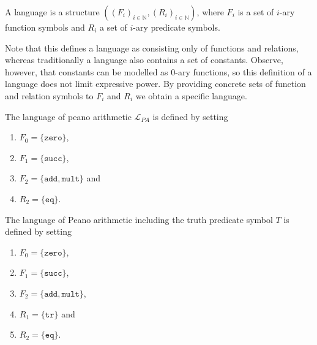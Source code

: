 \begin{definition}\label{def:FO-language}
    \leanok
    A language is a structure $((F_i)_{i\in \mathbb{N}}, (R_i)_{i\in \mathbb{N}})$, where $F_i$ is a set of $i$-ary function symbols and $R_i$ a set of $i$-ary predicate symbols.
\end{definition}

Note that this defines a language as consisting only of functions and relations, whereas traditionally a language also contains a set of constants. Observe, however, that constants can be modelled as $0$-ary functions, so this definition of a language does not limit expressive power. By providing concrete sets of function and relation symbols to $F_i$ and $R_i$ we obtain a specific language.

\begin{definition}\label{def:LPA}
    \leanok
    The language of peano arithmetic $\mathcal{L}_{PA}$ is defined by setting
    \begin{enumerate}
        \item $F_0 = \{\texttt{zero}\}$,
        \item $F_1 = \{\texttt{succ}\}$,
        \item $F_2 = \{\texttt{add},\texttt{mult}\}$ and
        \item $R_2 = \{\texttt{eq}\}$.
    \end{enumerate}
\end{definition} 

\begin{definition}
    \leanok
    The language of Peano arithmetic including the truth predicate symbol $T$ is defined by setting
    \begin{enumerate}
        \item $F_0 = \{\texttt{zero}\}$,
        \item $F_1 = \{\texttt{succ}\}$,
        \item $F_2 = \{\texttt{add}, \texttt{mult}\}$,
        \item $R_1 = \{\texttt{tr}\}$ and
        \item $R_2 = \{\texttt{eq}\}$.
    \end{enumerate}
\end{definition}

